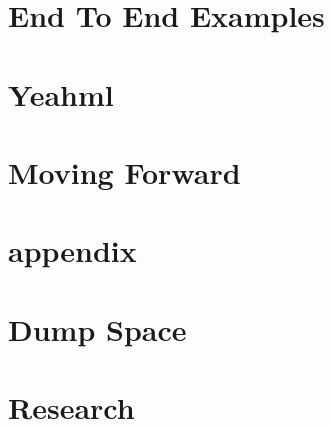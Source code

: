 \documentclass[12pt]{book}
\begin{document}
\part{End To End Examples}



\part{Yeahml}




\part{Moving Forward}



\part{appendix}




\part{Dump Space}




\part{Research}





\backmatter 


\printindex



%
%
%

{\footnotesize
	}
%
\end{document}
